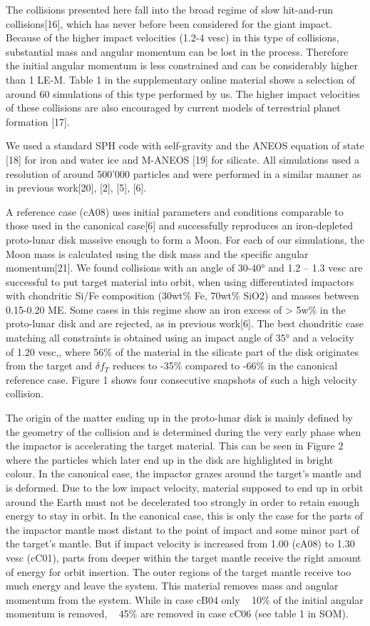 The collisions presented here fall into the broad regime of slow hit-and-run collisions[16], which has never before been considered for the giant impact. Because of the higher impact velocities (1.2-4 vesc) in this type of collisions, substantial mass and angular momentum can be lost in the process. Therefore the initial angular momentum is less constrained and can be considerably higher than 1 LE-M. Table 1 in the supplementary online material shows a selection of around 60 simulations of this type performed by us. The higher impact velocities of these collisions are also encouraged by current models of terrestrial planet formation [17]. 

We used a standard SPH code with self-gravity and the ANEOS equation of state [18] for iron and water ice and M-ANEOS [19] for silicate. All simulations used a resolution of around 500'000 particles and were performed in a similar manner as in previous work[20], [2], [5], [6]. 

A reference case (cA08) uses initial parameters and conditions comparable to those used in the canonical case[6] and successfully reproduces an iron-depleted proto-lunar disk massive enough to form a Moon.  For each of our simulations, the Moon mass is calculated using the disk mass and the specific angular momentum[21]. We found collisions with an angle of 30-40° and 1.2 – 1.3 vesc are successful to put target material into orbit, when using differentiated impactors with chondritic Si/Fe composition (30wt\% Fe, 70wt\% SiO2) and masses between 0.15-0.20 ME. Some cases in this regime show an iron excess of > 5w\% in the proto-lunar disk and are rejected, as in previous work[6]. The best chondritic case matching all constraints is obtained using an impact angle of 35° and a velocity of 1.20 vesc,, where 56\% of the material in the silicate part of the disk originates from the target and $\delta f_{T}$ reduces to -35\% compared to -66\% in the canonical reference case. Figure 1 shows four consecutive snapshots of such a high velocity collision.

The origin of the matter ending up in the proto-lunar disk is mainly defined by the geometry of the collision and is determined during the very early phase when the impactor is accelerating the target material. This can be seen in Figure 2 where the particles which later end up in the disk are highlighted in bright colour. In the canonical case, the impactor grazes around the target's mantle and is deformed. Due to the low impact velocity, material supposed to end up in orbit around the Earth must not be decelerated too strongly in order to retain enough energy to stay in orbit. In the canonical case, this is only the case for the parts of the impactor mantle most distant to the point of impact and some minor part of the target's mantle. But if impact velocity is increased from 1.00 (cA08) to 1.30 vesc (cC01), parts from deeper within the target mantle receive the right amount of energy for orbit insertion. The outer regions of the target mantle receive too much energy and leave the system. This material removes mass and angular momentum from the system. While in case cB04 only ~ 10\% of the initial angular momentum is removed, ~ 45\% are removed in case cC06 (see table 1 in SOM).

